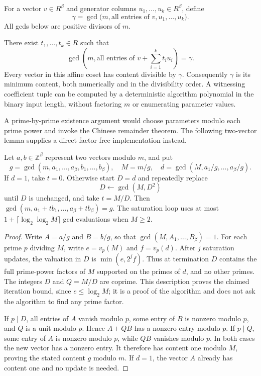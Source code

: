 For a vector $v\in R^\beta$ and generator columns $u_1,\ldots,u_k\in R^\beta$,
define
\[
 \gamma=\gcd\bigl(m,\text{all entries of }v,u_1,\ldots,u_k\bigr).
\]
All gcds below are positive divisors of $m$.

\begin{theorem}
\label{thm:attained-affine-content}
There exist $t_1,\ldots,t_k\in R$ such that
\[
 \gcd\left(m,\text{all entries of }v+\sum_{i=1}^k t_i u_i\right)=\gamma.
\]
Every vector in this affine coset has content divisible by $\gamma$.
Consequently $\gamma$ is its minimum content, both numerically and in the
divisibility order.  A witnessing coefficient tuple can be computed by a
deterministic algorithm polynomial in the binary input length, without
factoring $m$ or enumerating parameter values.
\end{theorem}

A prime-by-prime existence argument would choose parameters modulo each
prime power and invoke the Chinese remainder theorem.  The following
two-vector lemma supplies a direct factor-free implementation instead.

\begin{lemma}
\label{lem:content-merge}
Let $a,b\in\mathbb Z^\beta$ represent two vectors modulo $m$, and put
\[
 g=\gcd(m,a_1,\ldots,a_\beta,b_1,\ldots,b_\beta),\quad
 M=m/g,\quad d=\gcd(M,a_1/g,\ldots,a_\beta/g).
\]
If $d=1$, take $t=0$.  Otherwise start $D=d$ and repeatedly replace
\begin{equation}
 D\longleftarrow\gcd(M,D^2)
 \label{eq:gcd-saturation}
\end{equation}
until $D$ is unchanged, and take $t=M/D$.  Then
$\gcd(m,a_1+t b_1,\ldots,a_\beta+t b_\beta)=g$.
The saturation loop uses at most $1+\lceil\log_2\log_2 M\rceil$
gcd evaluations when $M\geq2$.
\end{lemma}

\begin{proof}
Write $A=a/g$ and $B=b/g$, so that $\gcd(M,A_1,\ldots,B_\beta)=1$.
For each prime $p$ dividing $M$, write $e=v_p(M)$ and $f=v_p(d)$.
After $j$ saturation updates, the valuation in $D$ is
$\min(e,2^j f)$.  Thus at termination $D$ contains the full prime-power
factors of $M$ supported on the primes of $d$, and no other primes.
The integers $D$ and $Q=M/D$ are coprime.  This description proves the
claimed iteration bound, since $e\leq\log_2 M$; it is a proof of the
algorithm and does not ask the algorithm to find any prime factor.

If $p\mid D$, all entries of $A$ vanish modulo $p$, some entry of $B$ is
nonzero modulo $p$, and $Q$ is a unit modulo $p$.  Hence $A+QB$ has a
nonzero entry modulo $p$.  If $p\mid Q$, some entry of $A$ is nonzero
modulo $p$, while $QB$ vanishes modulo $p$.  In both cases the new vector
has a nonzero entry.  It therefore has content one modulo $M$, proving
the stated content $g$ modulo $m$.  If $d=1$, the vector $A$ already has
content one and no update is needed.
\end{proof}

